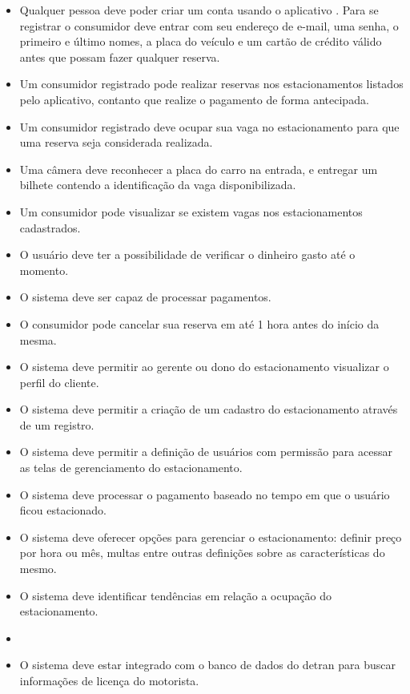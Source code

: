 \begin{itemize}
	\item Qualquer pessoa deve poder criar um conta usando o aplicativo \projectName{}. Para se registrar o consumidor deve entrar com seu endereço de e-mail, uma senha, o primeiro e último nomes, a placa do veículo e um cartão de crédito válido antes que possam fazer qualquer reserva.
	\item Um consumidor registrado pode realizar reservas nos estacionamentos listados pelo aplicativo, contanto que realize o pagamento de forma antecipada.
	\item Um consumidor registrado deve ocupar sua vaga no estacionamento para que uma reserva seja considerada realizada.
	\item Uma câmera deve reconhecer a placa do carro na entrada, e entregar um bilhete contendo a identificação da vaga disponibilizada.
	\item Um consumidor pode visualizar se existem vagas nos estacionamentos cadastrados.
	\item O usuário deve ter a possibilidade de verificar o dinheiro gasto até o momento.
	\item O sistema deve ser capaz de processar pagamentos.
	\item O consumidor pode cancelar sua reserva em até 1 hora antes do início da mesma.
	\item O sistema deve permitir ao gerente ou dono do estacionamento visualizar o perfil do cliente.
	\item O sistema deve permitir a criação de um cadastro do estacionamento através de um registro.
	\item O sistema deve permitir a definição de usuários com permissão para acessar as telas de gerenciamento do estacionamento.
	\item O sistema deve processar o pagamento baseado no tempo em que o usuário ficou estacionado.
	\item O sistema deve oferecer opções para gerenciar o estacionamento: definir preço por hora ou mês, multas entre outras definições sobre as características do mesmo.
	\item O sistema deve identificar tendências em relação a ocupação do estacionamento.
	\item %
	\item O sistema deve estar integrado com o banco de dados do detran para buscar informações de licença do motorista.

\end{itemize}
